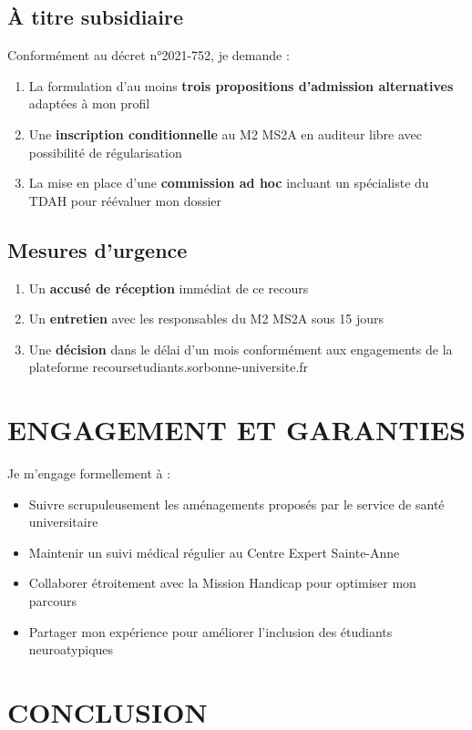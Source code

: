 \documentclass[12pt,french,a4paper]{article}
\begin{document}
\subsection{À titre subsidiaire}

Conformément au décret n°2021-752, je demande :
\begin{enumerate}
\item La formulation d'au moins \textbf{trois propositions d'admission alternatives} adaptées à mon profil
\item Une \textbf{inscription conditionnelle} au M2 MS2A en auditeur libre avec possibilité de régularisation
\item La mise en place d'une \textbf{commission ad hoc} incluant un spécialiste du TDAH pour réévaluer mon dossier
\end{enumerate}

\subsection{Mesures d'urgence}

\begin{enumerate}
\item Un \textbf{accusé de réception} immédiat de ce recours
\item Un \textbf{entretien} avec les responsables du M2 MS2A sous 15 jours
\item Une \textbf{décision} dans le délai d'un mois conformément aux engagements de la plateforme recoursetudiants.sorbonne-universite.fr
\end{enumerate}

\section{ENGAGEMENT ET GARANTIES}

Je m'engage formellement à :
\begin{itemize}
\item Suivre scrupuleusement les aménagements proposés par le service de santé universitaire
\item Maintenir un suivi médical régulier au Centre Expert Sainte-Anne
\item Collaborer étroitement avec la Mission Handicap pour optimiser mon parcours
\item Partager mon expérience pour améliorer l'inclusion des étudiants neuroatypiques
\end{itemize}

\section{CONCLUSION}
\end{document}
